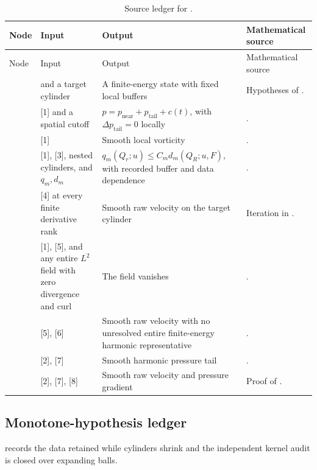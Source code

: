 \documentclass[11pt,reqno]{amsart}
\theoremstyle{plain}
\theoremstyle{definition}
\theoremstyle{remark}
\numberwithin{equation}{section}
\begin{document}
\small
\begin{longtable}{@{}L{0.06\textwidth}L{0.20\textwidth}L{0.25\textwidth}L{0.40\textwidth}@{}}
\caption{Source ledger for .}
\label{tab:stokes-node-audit}\\
\toprule
Node & Input & Output & Mathematical source \\
\midrule
\endfirsthead
\toprule
Node & Input & Output & Mathematical source \\
\midrule
\endhead
[1] &  and a target cylinder & A finite-energy
state with fixed local buffers & Hypotheses of .
\tabularnewline\relax
[2] & [1] and a spatial cutoff & \(p=p_{\mathrm{near}}+
p_{\mathrm{tail}}+c(t)\), with \(\Delta p_{\mathrm{tail}}=0\) locally &
. \tabularnewline\relax
[3] & [1] & Smooth local vorticity &
. \tabularnewline\relax
[4] & [1], [3], nested cylinders, and \(q_m,d_m\) &
\(q_m(Q_r;u)\le C_md_m(Q_R;u,F)\), with recorded buffer and data dependence
& . \tabularnewline\relax
[5] & [4] at every finite derivative rank & Smooth raw velocity on the target
cylinder & Iteration in . \tabularnewline\relax
[6] & [1], [5], and any entire \(L^2\) field with zero divergence and curl & The field vanishes
& . \tabularnewline\relax
[7] & [5], [6] & Smooth raw velocity with no unresolved entire finite-energy
harmonic representative & .
\tabularnewline\relax
[8] & [2], [7] & Smooth harmonic pressure tail &
. \tabularnewline\relax
[9] & [2], [7], [8] & Smooth raw velocity and pressure gradient & Proof of
. \tabularnewline
\bottomrule
\end{longtable}
\normalsize

\subsection{Monotone-hypothesis ledger}

 records the data retained while cylinders shrink and
the independent kernel audit is closed over expanding balls.
\end{document}
